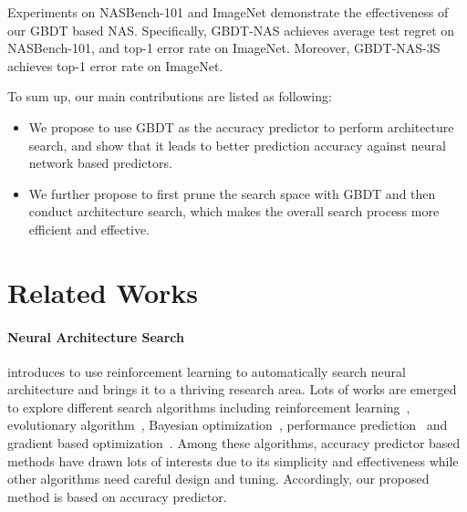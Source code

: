 \documentclass{article}
\begin{document}
Experiments on NASBench-101 and ImageNet demonstrate the effectiveness of our GBDT based NAS. Specifically, GBDT-NAS achieves  average test regret on NASBench-101, and  top-1 error rate on ImageNet. Moreover, GBDT-NAS-3S achieves  top-1 error rate on ImageNet.

To sum up, our main contributions are listed as following:
\begin{itemize}
    \item We propose to use GBDT as the accuracy predictor to perform architecture search, and show that it leads to better prediction accuracy against neural network based predictors.
    \item We further propose to first prune the search space with GBDT and then conduct architecture search, which makes the overall search process more efficient and effective.
\end{itemize}

\section{Related Works}
\label{sec:rework}
\paragraph{Neural Architecture Search}
\cite{nas} introduces to use reinforcement learning to automatically search neural architecture and brings it to a thriving research area. Lots of works are emerged to explore different search algorithms including reinforcement learning~\cite{nasnet,enas}, evolutionary algorithm~\cite{genetic_cnn,evolvingNN,EA_2017,amoebanet}, Bayesian optimization~\cite{bayesnas}, performance prediction~\cite{perfpred,PNAS,nao,neuralpredictor} and gradient based optimization~\cite{nao,darts,seminas}. Among these algorithms, accuracy predictor based methods have drawn lots of interests due to its simplicity and effectiveness while other algorithms need careful design and tuning. Accordingly, our proposed method is based on accuracy predictor.
\end{document}
